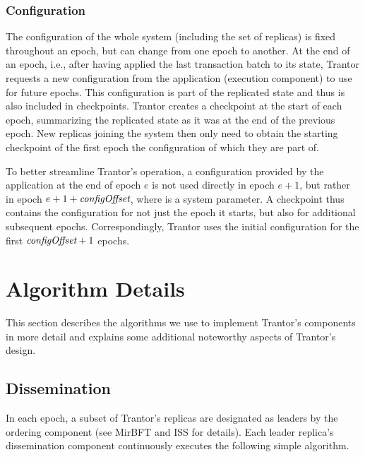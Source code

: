 \documentclass{article}
\begin{document}
\subsubsection{Configuration}
\label{sec:configuration}

The configuration of the whole system (including the set of replicas) is fixed throughout an epoch,
but can change from one epoch to another.
At the end of an epoch, i.e., after having applied the last transaction batch to its state,
Trantor requests a new configuration from the application (execution component) to use for future epochs.
This configuration is part of the replicated state and thus is also included in checkpoints.
Trantor creates a checkpoint at the start of each epoch,
summarizing the replicated state as it was at the end of the previous epoch.
New replicas joining the system then only need to obtain the starting checkpoint
of the first epoch the configuration of which they are part of.

To better streamline Trantor’s operation,
a configuration provided by the application at the end of epoch $e$ is not used directly in epoch $e+1$,
but rather in epoch $e+1+\textit{configOffset}$, where  is a system parameter.
A checkpoint thus contains the configuration for not just the epoch it starts,
but also for  additional subsequent epochs.
Correspondingly, Trantor uses the initial configuration for the first $\textit{configOffset}+1$ epochs.

\section{Algorithm Details}
\label{sec:algorithm-details}

This section describes the algorithms we use to implement Trantor’s components in more detail
and explains some additional noteworthy aspects of Trantor’s design.

\subsection{Dissemination}

In each epoch, a subset of Trantor’s replicas are designated as leaders by the ordering component
(see MirBFT \cite{mirbft} and ISS \cite{iss} for details).
Each leader replica’s dissemination component continuously executes the following simple algorithm.
\end{document}
